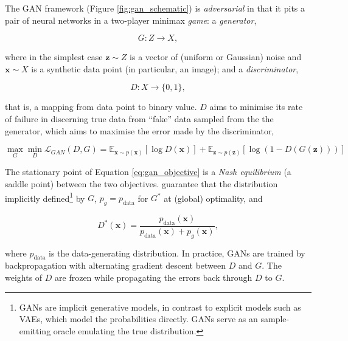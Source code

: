 The GAN framework (Figure \ref{fig:gan_schematic}) is \emph{adversarial} in that it pits a pair of neural networks in a two-player minimax \emph{game}: a \emph{generator},

\begin{equation}
G : Z \to X,
\end{equation}

where in the simplest case $\mathbf{z} \sim Z$ is a vector of (uniform or Gaussian) noise and $\mathbf{x} \sim X$ is a synthetic data point (in particular, an image); and a \emph{discriminator},

\begin{equation}
D : X \to \{0, 1\},
\end{equation}

that is, a mapping from data point to binary value. $D$ aims to minimise its rate of failure in discerning true data from ``fake'' data sampled from the the generator, which aims to maximise the error made by the discriminator,

\begin{equation}
\max_G\min_D\mathcal{L}_{GAN}(D, G) = \mathbb{E}_{\mathbf{x} \sim p(\mathbf{x})}[\log D(\mathbf{x})] + \mathbb{E}_{\mathbf{z} \sim p(\mathbf{z})}[\log(1 - D(G(\mathbf{z})))]
\label{eq:gan_objective}
\end{equation}

The stationary point of Equation \ref{eq:gan_objective} is a \emph{Nash equilibrium} (a saddle point) between the two objectives. \cite{goodfellow2014generative} guarantee that the distribution implicitly defined\footnote{GANs are implicit generative models, in contrast to explicit models such as VAEs, which model the probabilities directly. GANs serve as an sample-emitting oracle emulating the true distribution.} by $G$, $p_g = p_{\text{data}}$ for $G^*$ at (global) optimality, and 

\begin{equation}
D^*(\mathbf{x}) = \frac{p_{\text{data}}(\mathbf{x})}{p_{\text{data}}(\mathbf{x}) + p_{g}(\mathbf{x})},
\end{equation}

where $p_{\text{data}}$ is the data-generating distribution. In practice, GANs are trained by backpropagation with alternating gradient descent between $D$ and $G$. The weights of $D$ are frozen while propagating the errors back through $D$ to $G$.

